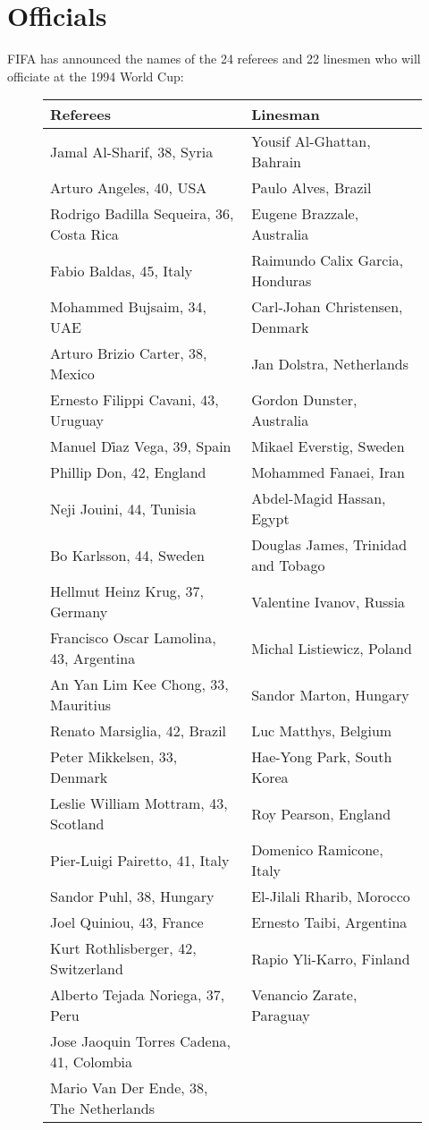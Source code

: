 \chapter{Officials}
\newline
\newline
FIFA has announced the names of the 24 referees and 22 linesmen who will officiate at the 1994 World Cup:
\begin{figure}[H]
\begin{tabular}{l l}
Referees & Linesman \\ \hline
Jamal Al-Sharif, 38, Syria & Yousif Al-Ghattan, Bahrain \\
Arturo Angeles, 40, USA & Paulo Alves, Brazil \\
Rodrigo Badilla Sequeira, 36, Costa Rica & Eugene Brazzale, Australia \\
Fabio Baldas, 45, Italy & Raimundo Calix Garcia, Honduras \\
Mohammed Bujsaim, 34, UAE  & Carl-Johan Christensen, Denmark \\
Arturo Brizio Carter, 38, Mexico & Jan Dolstra, Netherlands \\
Ernesto Filippi Cavani, 43, Uruguay & Gordon Dunster, Australia \\
Manuel D{\.i}az Vega, 39, Spain & Mikael Everstig, Sweden \\
Phillip Don, 42, England & Mohammed Fanaei, Iran \\
Neji Jouini, 44, Tunisia & Abdel-Magid Hassan, Egypt \\
Bo Karlsson, 44, Sweden & Douglas James, Trinidad and Tobago \\
Hellmut Heinz Krug, 37, Germany & Valentine Ivanov, Russia \\
Francisco Oscar Lamolina, 43, Argentina & Michal Listiewicz, Poland \\
An Yan Lim Kee Chong, 33, Mauritius & Sandor Marton, Hungary \\
Renato Marsiglia, 42, Brazil & Luc Matthys, Belgium \\
Peter Mikkelsen, 33, Denmark & Hae-Yong Park, South Korea \\
Leslie William Mottram, 43, Scotland & Roy Pearson, England \\
Pier-Luigi Pairetto, 41, Italy  & Domenico Ramicone, Italy \\
Sandor Puhl, 38, Hungary & El-Jilali Rharib, Morocco \\
Joel Quiniou, 43, France & Ernesto Taibi, Argentina \\
Kurt Rothlisberger, 42, Switzerland & Rapio Yli-Karro, Finland \\
Alberto Tejada Noriega, 37, Peru & Venancio Zarate, Paraguay \\
Jose Jaoquin Torres Cadena, 41, Colombia & \\
Mario Van Der Ende, 38, The Netherlands & \\
\end{tabular}
\end{figure}
